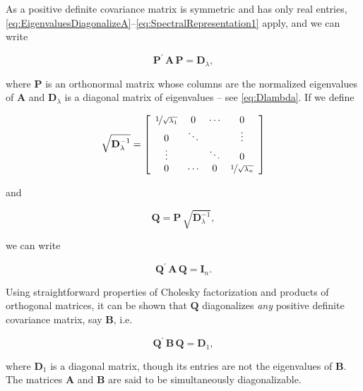 \documentclass[graybox,envcountchap,sectrefs]{svmono}\usepackage[]{graphicx}\usepackage[]{xcolor}
\begin{document}
\begin{appendices}
As a positive definite covariance matrix is symmetric and has only
real entries, \eqref{eq:EigenvaluesDiagonalizeA}--\eqref{eq:SpectralRepresentation1}
apply, and we can write

\begin{equation}
\mathbf{P}^{\prime}\,\mathbf{A}\,\mathbf{P}=\mathbf{D}_{\lambda},\label{eq:PDMatrixDiagonalization}
\end{equation}

where $\mathbf{P}$ is an orthonormal matrix whose columns are the
normalized eigenvalues of $\mathbf{A}$ and $\mathbf{D}_{\lambda}$
is a diagonal matrix of eigenvalues -- see \eqref{eq:Dlambda}. If
we define

\begin{equation}
\sqrt{\mathbf{D}_{\lambda}^{-1}}=\left[\begin{array}{cccc}
\nicefrac{1}{\sqrt{\lambda_{1}}} & 0 & \cdots & 0\\
0 & \ddots &  & \vdots\\
\vdots &  & \ddots & 0\\
0 & \cdots & 0 & \nicefrac{1}{\sqrt{\lambda_{n}}}
\end{array}\right]\label{eq:SqrtDlambdaInv}
\end{equation}

and

\begin{equation}
\mathbf{Q}=\mathbf{P}\,\sqrt{\mathbf{D}_{\lambda}^{-1}},\label{eq:QFromP}
\end{equation}

we can write

\begin{equation}
\mathbf{Q}^{\prime}\,\mathbf{A}\,\mathbf{Q}=\mathbf{I}_{n}.\label{eq:CovarianceMatrixInverse}
\end{equation}

Using straightforward properties of Cholesky factorization and products
of orthogonal matrices, it can be shown that $\mathbf{Q}$ diagonalizes
\emph{any} positive definite covariance matrix, say $\mathbf{B}$,
i.e.

\begin{equation}
\mathbf{Q}^{\prime}\,\mathbf{B}\,\mathbf{Q}=\mathbf{D}_{1},\label{eq:PdiagonalizesB}
\end{equation}

where $\mathbf{D}_{1}$ is a diagonal matrix, though its entries are
not the eigenvalues of $\mathbf{B}$. The matrices $\mathbf{A}$ and
$\mathbf{B}$ are said to be simultaneously diagonalizable.



\end{appendices}
\end{document}
